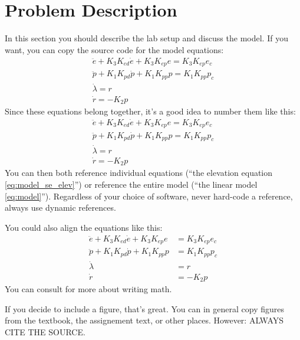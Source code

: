 \section{Problem Description}\label{sec:prob_descr}
In this section you should describe the lab setup and discuss the model. If you want, you can copy the source code for the model equations:
\begin{gather}
	\ddot{e} + K_{3} K_{ed} \dot{e} + K_{3} K_{ep} e = K_{3} K_{ep} e_{c} \label{eq:model_elev} \\
	\ddot{p} + K_{1} K_{pd} \dot{p} + K_{1} K_{pp} p = K_{1} K_{pp} p_{c} \label{eq:model_pitch} \\
	\dot{\lambda} = r \label{eq:model_lambda} \\
	\dot{r} = -K_{2} p \label{eq:model_r} 
\end{gather}
Since these equations belong together, it's a good idea to number them like this:
\begin{subequations}
\label{eq:model}
\begin{gather}
	\ddot{e} + K_{3} K_{ed} \dot{e} + K_{3} K_{ep} e = K_{3} K_{ep} e_{c} \label{eq:model_se_elev} \\
	\ddot{p} + K_{1} K_{pd} \dot{p} + K_{1} K_{pp} p = K_{1} K_{pp} p_{c} \label{eq:model_se_pitch} \\
	\dot{\lambda} = r \label{eq:model_se_lambda} \\
	\dot{r} = -K_{2} p \label{eq:model_se_r} 
\end{gather}
\end{subequations}
You can then both reference individual equations (``the elevation equation \eqref{eq:model_se_elev}'') or reference the entire model (``the linear model \eqref{eq:model}''). Regardless of your choice of software, never hard-code a reference, always use dynamic references. 

You could also align the equations like this:
\begin{subequations}
\label{eq:model_al}
\begin{align}
	\ddot{e} + K_{3} K_{ed} \dot{e} + K_{3} K_{ep} e &= K_{3} K_{ep} e_{c} \label{eq:model_se_al_elev} \\
	\ddot{p} + K_{1} K_{pd} \dot{p} + K_{1} K_{pp} p &= K_{1} K_{pp} p_{c} \label{eq:model_se_al_pitch} \\
	\dot{\lambda} &= r \label{eq:model_se_al_lambda} \\
	\dot{r} &= -K_{2} p \label{eq:model_se_al_r} 
\end{align}
\end{subequations}
You can consult \citet{Downes2002} for more about writing math.

If you decide to include a figure, that's great. You can in general copy figures from the textbook, the assignement text, or other places. However: ALWAYS CITE THE SOURCE.